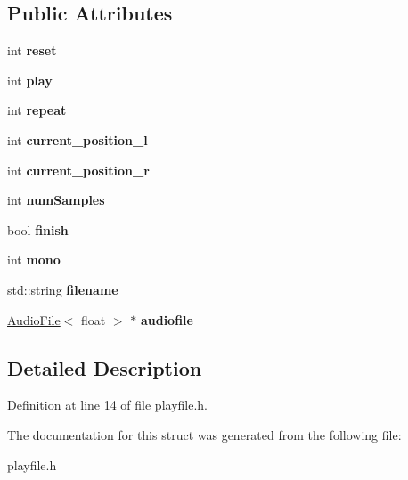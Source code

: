 \subsection*{Public Attributes}
\begin{DoxyCompactItemize}
\item 
\mbox{\label{structfile__play_1_1playfile__param__t_a4cd8a16e1ad9bd8c462bd4b2fd9d7242}} 
int {\bfseries reset}
\item 
\mbox{\label{structfile__play_1_1playfile__param__t_aa861e2375a83bb4a20c175fa82b2b227}} 
int {\bfseries play}
\item 
\mbox{\label{structfile__play_1_1playfile__param__t_a91b362cb97d65ba95b453469515243ed}} 
int {\bfseries repeat}
\item 
\mbox{\label{structfile__play_1_1playfile__param__t_a37f40197ccb20277f79d16d9c14359f8}} 
int {\bfseries current\+\_\+position\+\_\+l}
\item 
\mbox{\label{structfile__play_1_1playfile__param__t_aa8b2c7aa5c332fdc76fa37d9d9848aad}} 
int {\bfseries current\+\_\+position\+\_\+r}
\item 
\mbox{\label{structfile__play_1_1playfile__param__t_acf92d55c66df1bb9b48439e0c1e79cf8}} 
int {\bfseries num\+Samples}
\item 
\mbox{\label{structfile__play_1_1playfile__param__t_a0f4fabcfbbee96f2dcf821209ef911f6}} 
bool {\bfseries finish}
\item 
\mbox{\label{structfile__play_1_1playfile__param__t_ac4be30af47c7f8c288a52238cae89ac9}} 
int {\bfseries mono}
\item 
\mbox{\label{structfile__play_1_1playfile__param__t_a16c994370868737c1679d36ce32db427}} 
std\+::string {\bfseries filename}
\item 
\mbox{\label{structfile__play_1_1playfile__param__t_a5864aa1b0900ea84406f3548f95c38b5}} 
\hyperlink{classAudioFile}{Audio\+File}$<$ float $>$ $\ast$ {\bfseries audiofile}
\end{DoxyCompactItemize}


\subsection{Detailed Description}


Definition at line 14 of file playfile.\+h.



The documentation for this struct was generated from the following file\+:\begin{DoxyCompactItemize}
\item 
playfile.\+h\end{DoxyCompactItemize}
